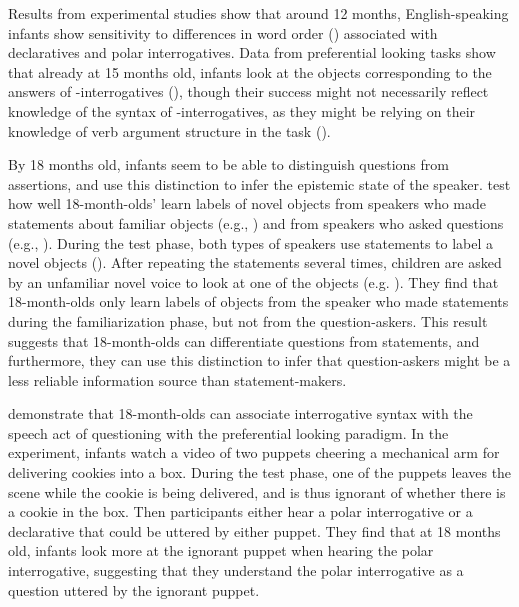 Results from experimental studies show that around 12 months, English-speaking infants show sensitivity to differences in word order (\citealt{geffenmintz2015wordorder}) associated with declaratives and polar interrogatives. Data from preferential looking tasks show that already at 15 months old, infants look at the objects corresponding to the answers of \twh-interrogatives (\citealt{seidl2003wh, gagliardi2016wh, perkins2020filler}), though their success might not necessarily reflect knowledge of the syntax of \twh-interrogatives, as they might be relying on their knowledge of verb argument structure in the task (\citealt{perkins2019}). 

By 18 months old, infants seem to be able to distinguish questions from assertions, and use this distinction to infer the epistemic state of the speaker. \textcite{luchkina2018infant} test how well 18-month-olds’ learn labels of novel objects from speakers who made statements about familiar objects (e.g., ) and from speakers who asked questions (e.g., ). During the test phase, both types of speakers use statements to label a novel objects (). After repeating the statements several times, children are asked by an unfamiliar novel voice to look at one of the objects (e.g. ). They find that 18-month-olds only learn labels of objects from the speaker who made statements during the familiarization phase, but not from the question-askers. This result suggests that 18-month-olds can differentiate questions from statements, and furthermore, they can use this distinction to infer that question-askers might be a less reliable information source than statement-makers. 

\textcite{marshmallowqueen} demonstrate that 18-month-olds can associate interrogative syntax with the speech act of questioning with the preferential looking paradigm. In the experiment, infants watch a video of two puppets cheering a mechanical arm for delivering cookies into a box. During the test phase, one of the puppets leaves the scene while the cookie is being delivered, and is thus ignorant of whether there is a cookie in the box. Then participants either hear a polar interrogative  or a declarative  that could be uttered by either puppet. They find that at 18 months old, infants look more at the ignorant puppet when hearing the polar interrogative, suggesting that they understand the polar interrogative as a question uttered by the ignorant puppet.

